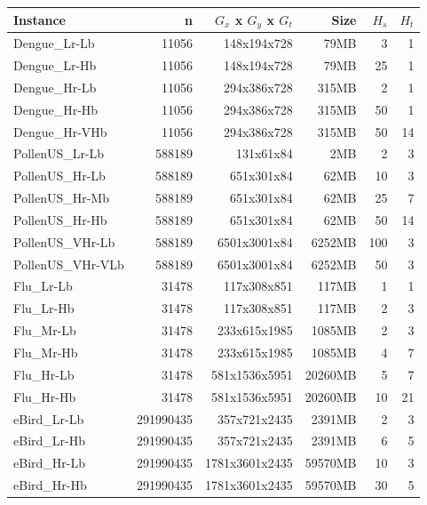 \begin{tabular}{|l|rrr|rr|}
\hline
Instance & n & $G_x$ x $G_y$ x $G_t$ & Size & $H_s$ & $H_t$ \\
\hline
Dengue\_Lr-Lb & 11056 & 148x194x728 & 79MB & 3 & 1 \\
Dengue\_Lr-Hb & 11056 & 148x194x728 & 79MB & 25 & 1 \\
Dengue\_Hr-Lb & 11056 & 294x386x728 & 315MB & 2 & 1 \\
Dengue\_Hr-Hb & 11056 & 294x386x728 & 315MB & 50 & 1 \\
Dengue\_Hr-VHb & 11056 & 294x386x728 & 315MB & 50 & 14 \\
PollenUS\_Lr-Lb & 588189 & 131x61x84 & 2MB & 2 & 3 \\
PollenUS\_Hr-Lb & 588189 & 651x301x84 & 62MB & 10 & 3 \\
PollenUS\_Hr-Mb & 588189 & 651x301x84 & 62MB & 25 & 7 \\
PollenUS\_Hr-Hb & 588189 & 651x301x84 & 62MB & 50 & 14 \\
PollenUS\_VHr-Lb & 588189 & 6501x3001x84 & 6252MB & 100 & 3 \\
PollenUS\_VHr-VLb & 588189 & 6501x3001x84 & 6252MB & 50 & 3 \\
Flu\_Lr-Lb & 31478 & 117x308x851 & 117MB & 1 & 1 \\
Flu\_Lr-Hb & 31478 & 117x308x851 & 117MB & 2 & 3 \\
Flu\_Mr-Lb & 31478 & 233x615x1985 & 1085MB & 2 & 3 \\
Flu\_Mr-Hb & 31478 & 233x615x1985 & 1085MB & 4 & 7 \\
Flu\_Hr-Lb & 31478 & 581x1536x5951 & 20260MB & 5 & 7 \\
Flu\_Hr-Hb & 31478 & 581x1536x5951 & 20260MB & 10 & 21 \\
eBird\_Lr-Lb & 291990435 & 357x721x2435 & 2391MB & 2 & 3 \\
eBird\_Lr-Hb & 291990435 & 357x721x2435 & 2391MB & 6 & 5 \\
eBird\_Hr-Lb & 291990435 & 1781x3601x2435 & 59570MB & 10 & 3 \\
eBird\_Hr-Hb & 291990435 & 1781x3601x2435 & 59570MB & 30 & 5 \\
\hline
\end{tabular}
